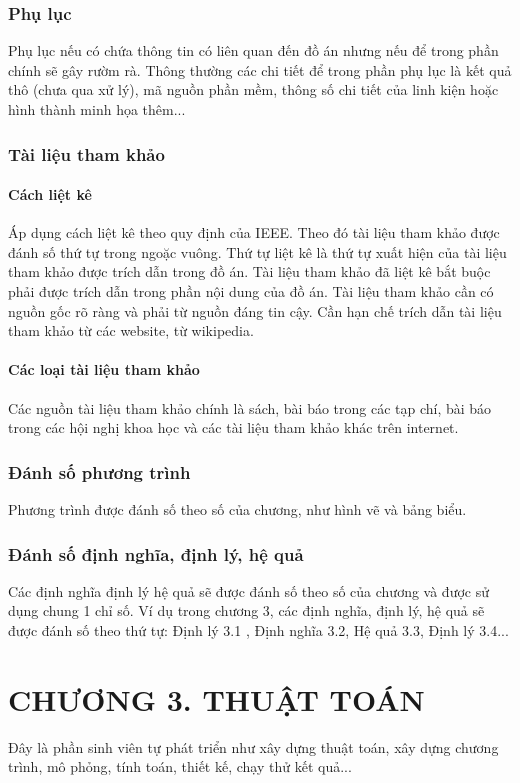 \subsubsection{Phụ lục}
Phụ lục nếu có chứa thông tin có liên quan đến đồ án nhưng nếu để trong phần chính sẽ gây rườm rà. Thông thường các chi tiết để trong phần phụ lục là kết quả thô (chưa qua xử lý), mã nguồn phần mềm, thông số chi tiết của linh kiện hoặc hình thành minh họa thêm...
\subsubsection{Tài liệu tham khảo}
\paragraph{Cách liệt kê} \mbox{} %

Áp dụng cách liệt kê theo quy định của IEEE. Theo đó tài liệu tham khảo được đánh số thứ tự trong ngoặc vuông. Thứ tự liệt kê là thứ tự xuất hiện của tài liệu tham khảo được trích dẫn trong đồ án. Tài liệu tham khảo đã liệt kê bắt buộc phải được trích dẫn trong phần nội dung của đồ án. Tài liệu tham khảo cần có nguồn gốc rõ ràng và phải từ nguồn đáng tin cậy. Cần hạn chế trích dẫn tài liệu tham khảo từ các website, từ wikipedia.
\paragraph{Các loại tài liệu tham khảo} \mbox{} %

Các nguồn tài liệu tham khảo chính là sách, bài báo trong các tạp chí, bài báo trong các hội nghị khoa học và các tài liệu tham khảo khác trên internet.
\subsubsection{Đánh số phương trình}
Phương trình được đánh số theo số của chương, như hình vẽ và bảng biểu.
\subsubsection{Đánh số định nghĩa, định lý, hệ quả}
Các định nghĩa định lý hệ quả sẽ được đánh số theo số của chương và được sử dụng chung 1 chỉ số. Ví dụ trong chương 3, các định nghĩa, định lý, hệ quả sẽ được đánh số theo thứ tự: Định lý 3.1 , Định nghĩa 3.2, Hệ quả 3.3, Định lý 3.4...

\cleardoublepage
{}\section*{\centering CHƯƠNG 3. THUẬT TOÁN}
\setcounter{section}{3}
\setcounter{subsection}{0}
\setcounter{figure}{0}
\setcounter{table}{0}
Đây \cite{stein2011fourier} là phần sinh viên tự phát triển như xây dựng thuật toán, xây dựng chương trình, mô phỏng, tính toán, thiết kế, chạy thử kết quả... \cite{howell2016principles}
